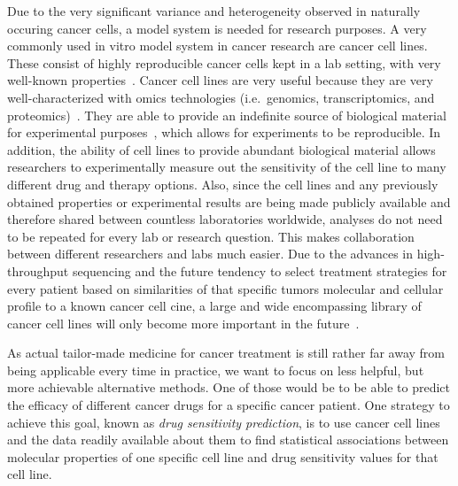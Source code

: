 Due to the very significant variance and heterogeneity observed in naturally occuring cancer cells, a model system is needed for research purposes. A very commonly used in vitro model system in cancer research are cancer cell lines. These consist of highly reproducible cancer cells kept in a lab setting, with very well-known properties~\cite{cancer_cell_line_definition}. Cancer cell lines are very useful because they are very well-characterized with omics technologies (i.e.\ genomics, transcriptomics, and proteomics)~\cite{cancer_cell_lines_useful_model}. They are able to provide an indefinite source of biological material for experimental purposes~\cite{cancer_cell_lines_useful_model}, which allows for experiments to be reproducible. In addition, the ability of cell lines to provide abundant biological material allows researchers to experimentally measure out the sensitivity of the cell line to many different drug and therapy options. Also, since the cell lines and any previously obtained properties or experimental results are being made publicly available and therefore shared between countless laboratories worldwide, analyses do not need to be repeated for every lab or research question. This makes collaboration between different researchers and labs much easier. Due to the advances in high-throughput sequencing and the future tendency to select treatment strategies for every patient based on similarities of that specific tumors molecular and cellular profile to a known cancer cell cine, a large and wide encompassing library of cancer cell lines will only become more important in the future~\cite{cancer_cell_lines_useful_model}.

As actual tailor-made medicine for cancer treatment is still rather far away from being applicable every time in practice, we want to focus on less helpful, but more achievable alternative methods. One of those would be to be able to predict the efficacy of different cancer drugs for a specific cancer patient. One strategy to achieve this goal, known as \textit{drug sensitivity prediction}, is to use cancer cell lines and the data readily available about them to find statistical associations between molecular properties of one specific cell line and drug sensitivity values for that cell line.%

